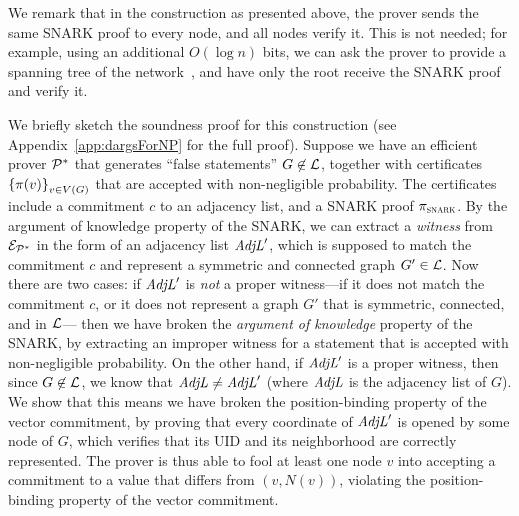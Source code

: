 	We remark that in the construction as presented above, the prover sends the same SNARK proof to every node,
	and all nodes verify it. This is not needed;
	for example, 
	using an additional $O(\log n)$ bits,
	we can ask the prover to provide a spanning tree of the network~\cite{korman2005proof},
	and have only the root receive the SNARK proof and verify it.

We briefly sketch the soundness proof for this construction (see Appendix~\ref{app:dargsForNP} for the full proof).
Suppose we have an efficient prover $\mathcal{P}^*$ that generates ``false statements''
$G \not \in \mathcal{L}$,
together with certificates $\left \{{\pi(v)} \right \}_{v \in V(G)}$
that are accepted with non-negligible probability.
The certificates include a commitment $c$ to an adjacency list, and a SNARK proof $\pi_\textsc{snark}$.
By the argument of knowledge property of the SNARK, we can extract a \emph{witness} from $\mathcal{E}_{\mathcal{P}^*}$ in the form of an adjacency list $\mathit{ AdjL }'$,
which is supposed to match the commitment $c$ and represent a symmetric and connected graph $G' \in \mathcal{L}$.
Now there are two cases:
if $\mathit{ AdjL }'$ is \emph{not} a proper witness---if it does not match the commitment $c$,
or it does not represent a graph $G'$ that is symmetric, connected, and in $\mathcal{L}$---%
then we have broken the \emph{argument of knowledge} property of the SNARK,
by extracting an improper witness for a statement that is accepted with non-negligible probability.
On the other hand, if $\mathit{ AdjL }'$ is a proper witness,
then since $G \not \in \mathcal{L}$, we know that $\mathit{ AdjL } \neq \mathit{ AdjL }'$ (where $\mathit{ AdjL }$
is the adjacency list of $G$).
We show that this means we have broken the position-binding property of the vector commitment,
by proving that every coordinate of $\mathit{ AdjL }'$ is opened by some node of $G$,
which verifies that its UID and its neighborhood are correctly represented.
The prover is thus able to fool at least one node $v$ into accepting a commitment to
a value that differs from $(v, N(v))$,
violating the position-binding property of the vector commitment.
